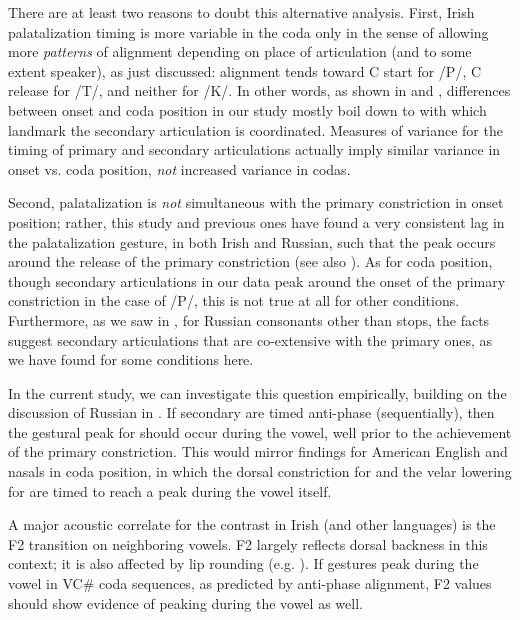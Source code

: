 \documentclass[output=paper,colorlinks,citecolor=brown]{langscibook}
\newcommand{\pal}{\ipa{ʲ}}
\newcommand{\vel}{\ipa{ˠ}}
\begin{document}
There are at least two reasons to doubt this alternative analysis. First, Irish palatalization timing is more variable in the coda only in the sense of allowing more \emph{patterns} of alignment depending on place of articulation (and to some extent speaker), as just discussed: alignment tends toward C start for /P\pal/, C release for /T\pal/, and neither for /K\pal/. In other words, as shown in  and , differences between onset and coda position in our study mostly boil down to with which landmark the secondary articulation is coordinated. Measures of variance for the timing of primary and secondary articulations actually imply similar variance in onset vs. coda position, \emph{not} increased variance in codas.

Second, palatalization is \emph{not} simultaneous with the primary constriction in onset position; rather, this study and previous ones have found a very consistent lag in the palatalization gesture, in both Irish and Russian, such that the peak occurs around the release of the primary constriction (see also \citealt{Shaw_etal2021_complex_segments}). As for coda position, though secondary articulations in our data peak around the onset of the primary constriction in the case of /P\pal/, this is not true at all for other conditions. Furthermore, as we saw in , for Russian consonants other than stops, the facts suggest secondary articulations that are co-extensive with the primary ones, as we have found for some conditions here.

In the current study, we can investigate this question empirically, building on the discussion of Russian in \citet{Iskarous_Kavitskaya2010_phonetic_variability}. If secondary \ipa{/C\pal\ C\vel/} are timed anti-phase (sequentially), then the gestural peak for \ipa{/C\pal\ C\vel/} should occur during the vowel, well prior to the achievement of the primary constriction. This would mirror findings for American English  and nasals in coda position, in which the dorsal constriction for  and the velar lowering for  are timed to reach a peak during the vowel itself.

A major acoustic correlate for the \ipa{/C\pal\ C\vel/} contrast in Irish (and other languages) is the F2 transition on neighboring vowels. F2 largely reflects dorsal backness in this context; it is also affected by lip rounding (e.g. \citealt{Bennett_etal2019_Irish_contrast_enhance}). If \ipa{/C\pal\ C\vel/} gestures peak during the vowel in VC\# coda sequences, as predicted by anti-phase alignment, F2 values should show evidence of peaking during the vowel as well.
\end{document}
